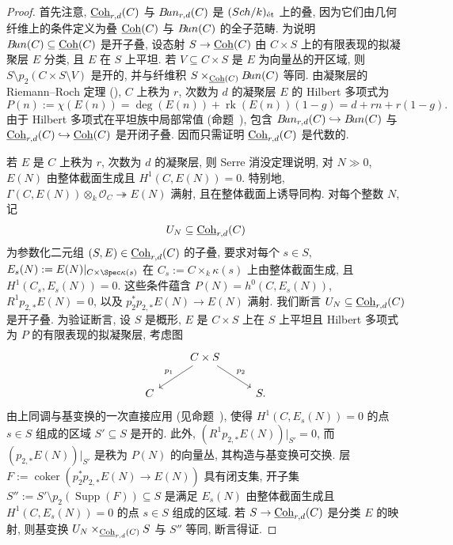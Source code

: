 \begin{proof}
首先注意, $\underline{\mathrm{Coh}}_{r,d}(C)$ 与 $B\!un_{r,d}(C)$ 是 $(Sch/k)_{\text{ét}}$ 上的叠, 因为它们由几何纤维上的条件定义为叠 $\underline{\mathrm{Coh}}(C)$ 与 $B\!un(C)$ 的全子范畴.
为说明 $B\!un(C)\subseteq\underline{\mathrm{Coh}}(C)$ 是开子叠, 设态射 $S\to\underline{\mathrm{Coh}}(C)$ 由 $C\times S$ 上的有限表现的拟凝聚层 $E$ 分类, 且 $E$ 在 $S$ 上平坦.
若 $V\subseteq C\times S$ 是 $E$ 为向量丛的开区域, 则 $S\setminus p_2(C\times S\setminus V)$ 是开的, 并与纤维积 $S\times_{\underline{\mathrm{Coh}}(C)}B\!un(C)$ 等同.
由凝聚层的 Riemann--Roch 定理 (), $C$ 上秩为 $r$, 次数为 $d$ 的凝聚层 $E$ 的 Hilbert 多项式为
\[
P(n):=\chi(E(n))=\deg(E(n))+\operatorname{rk}(E(n))(1-g)=d+rn+r(1-g).
\]
由于 Hilbert 多项式在平坦族中局部常值 (命题~), 包含 $B\!un_{r,d}(C)\hookrightarrow B\!un(C)$ 与 $\underline{\mathrm{Coh}}_{r,d}(C)\hookrightarrow\underline{\mathrm{Coh}}(C)$ 是开闭子叠. 因而只需证明 $\underline{\mathrm{Coh}}_{r,d}(C)$ 是代数的.

若 $E$ 是 $C$ 上秩为 $r$, 次数为 $d$ 的凝聚层, 则 Serre 消没定理说明, 对 $N\gg0$, $E(N)$ 由整体截面生成且 $H^1(C,E(N))=0$.
特别地, $\Gamma(C,E(N))\otimes_k\mathcal O_C\twoheadrightarrow E(N)$ 满射, 且在整体截面上诱导同构.
对每个整数 $N$, 记
\[
U_N\subseteq\underline{\mathrm{Coh}}_{r,d}(C)
\]
为参数化二元组 $(S,E)\in\underline{\mathrm{Coh}}_{r,d}(C)$ 的子叠, 要求对每个 $s\in S$, $E_s(N):=E(N)|_{C\times\Spec\kappa(s)}$ 在 $C_s:=C\times_k\kappa(s)$ 上由整体截面生成, 且 $H^1(C_s,E_s(N))=0$.
这些条件蕴含 $P(N)=h^0(C,E_s(N))$, $R^1p_{2,*}E(N)=0$, 以及 $p_2^*p_{2,*}E(N)\to E(N)$ 满射.
我们断言 $U_N\subseteq\underline{\mathrm{Coh}}_{r,d}(C)$ 是开子叠.
为验证断言, 设 $S$ 是概形, $E$ 是 $C\times S$ 上在 $S$ 上平坦且 Hilbert 多项式为 $P$ 的有限表现的拟凝聚层, 考虑图
\[
\begin{tikzcd}
&C\times S\arrow[dl,"p_1"']\arrow[dr,"p_2"]&\\
C&&S.
\end{tikzcd}
\]
由上同调与基变换的一次直接应用 (见命题~), 使得 $H^1(C,E_s(N))=0$ 的点 $s\in S$ 组成的区域 $S'\subseteq S$ 是开的.
此外, $(R^1p_{2,*}E(N))|_{S'}=0$, 而 $(p_{2,*}E(N))|_{S'}$ 是秩为 $P(N)$ 的向量丛, 其构造与基变换可交换.
层 $F:=\operatorname{coker}(p_2^*p_{2,*}E(N)\to E(N))$ 具有闭支集, 开子集 $S'':=S'\setminus p_2(\operatorname{Supp}(F))\subseteq S$ 是满足 $E_s(N)$ 由整体截面生成且 $H^1(C,E_s(N))=0$ 的点 $s\in S$ 组成的区域.
若 $S\to\underline{\mathrm{Coh}}_{r,d}(C)$ 是分类 $E$ 的映射, 则基变换 $U_N\times_{\underline{\mathrm{Coh}}_{r,d}(C)}S$ 与 $S''$ 等同, 断言得证.


\end{proof}
